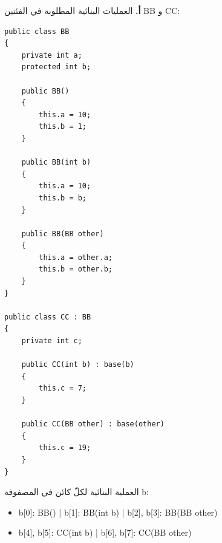 \def\bagrutTocEntry{\phantomsection\addcontentsline{toc}{subsection}{\texorpdfstring{سؤال $10$ امتحان $\mathrm{899271B}$ سنة $2026$}{سؤال 10 امتحان 899271B سنة 2026}}\global\let\bagrutTocEntry\relax}%



\ifwithsols
\begin{boxSolution}
\textbf{أ.} العمليات البنائية المطلوبة في الفئتين \textenglish{BB} و \textenglish{CC}:
\begin{boxCode}
\begin{english}
\begin{verbatim}
public class BB
{
    private int a;
    protected int b;

    public BB()
    {
        this.a = 10;
        this.b = 1;
    }

    public BB(int b)
    {
        this.a = 10;
        this.b = b;
    }

    public BB(BB other)
    {
        this.a = other.a;
        this.b = other.b;
    }
}

public class CC : BB
{
    private int c;

    public CC(int b) : base(b)
    {
        this.c = 7;
    }

    public CC(BB other) : base(other)
    {
        this.c = 19;
    }
}
\end{verbatim}
\end{english}
\end{boxCode}

العملية البنائية لكلّ كائن في المصفوفة \textenglish{b}:
\begin{itemize}[itemsep=0.2em]
    \item \textenglish{b[0]}: \textenglish{BB()} \quad | \quad \textenglish{b[1]}: \textenglish{BB(int b)} \quad | \quad \textenglish{b[2], b[3]}: \textenglish{BB(BB other)}
    \item \textenglish{b[4], b[5]}: \textenglish{CC(int b)} \quad | \quad \textenglish{b[6], b[7]}: \textenglish{CC(BB other)}
\end{itemize}
\end{boxSolution}

\filbreak

